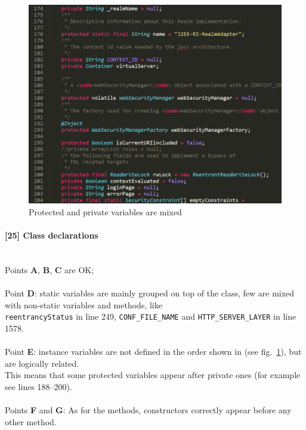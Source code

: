 \documentclass[a4paper, 11pt]{article}
\newcommand{\code}[1]{\texttt{#1}}
\newcommand{\issue}[3][?]{
    \paragraph{[#1] #2} \mbox{}\\ #3
}
\begin{document}
\begin{figure}[htb]
    \centering
    \includegraphics[width=\textwidth]{img/instancevariables.png}
    \caption{Protected and private variables are mixed}
    \label{fig:instancevariables}
\end{figure}

\issue[25]{Class declarations} {
    Points \textbf{A}, \textbf{B}, \textbf{C} are OK; \\ \\
    Point \textbf{D}: static variables are mainly grouped on top of 
    the class, few are mixed with non-static variables and methods, like \\
    \code{reentrancyStatus} in line 249, \code{CONF\_FILE\_NAME} and
    \code{HTTP\_SERVER\_LAYER} in line 1578. \\ \\ 
    Point \textbf{E}: instance variables are not 
    defined in the order shown in \cite{bib:assignment} 
    (see fig.~\ref{fig:instancevariables}), but are logically related. \\
    This means that some protected variables appear after private ones 
    (for example see lines 188--200). \\ \\ 
    Points \textbf{F} and \textbf{G}: As for the methods, constructors correctly appear before any 
    other method.
}
\end{document}
